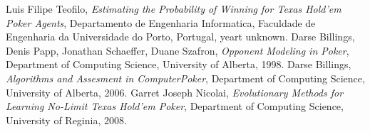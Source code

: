 

\begin{thebibliography}{9}
  Luis Filipe Teofilo,
  \textit{Estimating the Probability of Winning for Texas Hold'em Poker Agents},
  Departamento de Engenharia Informatica, Faculdade de Engenharia da Universidade do Porto,
  Portugal,
  yeart unknown.
  Darse Billings, Denis Papp, Jonathan Schaeffer, Duane Szafron,
  \textit{Opponent Modeling in Poker},
  Department of Computing Science, University of Alberta, 
 1998.
  Darse Billings,
  \textit{Algorithms and Assesment in ComputerPoker},
  Department of Computing Science, University of Alberta, 
 2006.
  Garret Joseph Nicolai,
  \textit{Evolutionary Methods for Learning No-Limit Texas Hold'em Poker},
  Department of Computing Science, University of Reginia, 
 2008.
\end{thebibliography}


